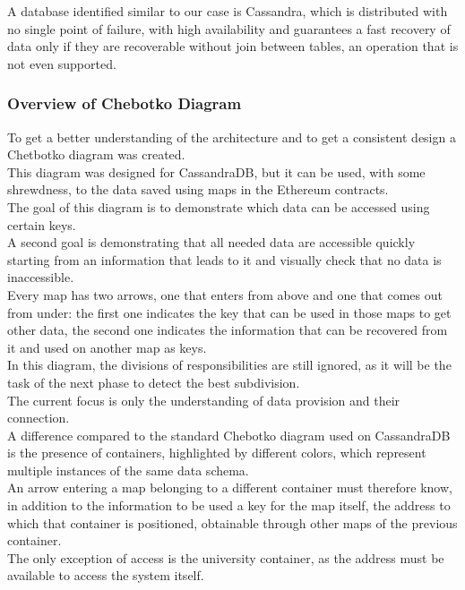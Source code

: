 \documentclass[ManualeSviluppatore]{subfiles}
\begin{document}
A database identified similar to our case is Cassandra, which is distributed with no single point of failure, with high availability and guarantees a fast recovery of data only if they are recoverable without join between tables, an operation that is not even supported.\\

\subsubsection{Overview of Chebotko Diagram}
To get a better understanding of the architecture and to get a consistent design a Chetbotko diagram was created.\\
This diagram was designed for CassandraDB, but it can be used, with some shrewdness, to the data saved using maps in the Ethereum contracts.\\
The goal of this diagram is to demonstrate which data can be accessed using certain keys.\\
A second goal is demonstrating that all needed data are accessible quickly starting from an information that leads to it and visually check that no data is inaccessible.\\
Every map has two arrows, one that enters from above and one that comes out from under: the first one indicates the key that can be used in those maps to get other data, the second one indicates the information that can be recovered from it and used on another map as keys.\\

In this diagram, the divisions of responsibilities are still ignored, as it will be the task of the next phase to detect the best subdivision.\\
The current focus is only the understanding of data provision and their connection.\\

A difference compared to the standard Chebotko diagram used on CassandraDB is the presence of containers, highlighted by different colors, which represent multiple instances of the same data schema.\\
An arrow entering a map belonging to a different container must therefore know, in addition to the information to be used a key for the map itself, the address to which that container is positioned, obtainable through other maps of the previous container.\\
The only exception of access is the university container, as the address must be available to access the system itself.\\
\end{document}
